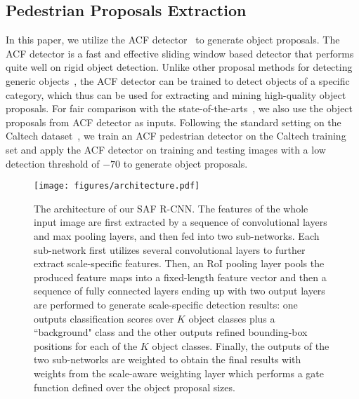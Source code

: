 \documentclass[journal]{IEEEtran}
\begin{document}
\subsection{Pedestrian Proposals Extraction}
In this paper, we utilize the ACF detector~\cite{dollar2014fast} to generate object proposals. The ACF detector is a fast and effective sliding window based detector that performs quite well on rigid object detection. Unlike other proposal methods for detecting generic objects~\cite{uijlings2013selective,arbelaez2014multiscale,zitnick2014edge}, the ACF detector can be trained to detect objects of a specific category, which thus can be used for extracting and mining high-quality object proposals. For fair comparison with the state-of-the-arts~\cite{hosang2015taking,ta_cnn}, we also use the object proposals from ACF detector as inputs. Following the standard setting on the Caltech dataset~\cite{dollar2012pedestrian}, we train an ACF pedestrian detector on the Caltech training set and apply the ACF detector on training and testing images with a low detection threshold of $-70$ to generate object proposals.

\begin{figure*}
	\begin{center}
		\texttt{[image: figures/architecture.pdf]}
		\caption{{The architecture of our SAF R-CNN. The features of the whole input image are first extracted by a sequence of convolutional layers and max pooling layers, and then fed into two sub-networks. Each sub-network first utilizes several convolutional layers to further extract scale-specific features. Then, an RoI pooling layer pools the produced feature maps into a fixed-length feature vector and then a sequence of fully connected layers ending up with two output layers are performed to generate scale-specific detection results: one outputs classification scores over $K$ object classes plus a ``background" class and the other outputs refined bounding-box positions for each of the $K$ object classes. Finally, the outputs of the two sub-networks are weighted to obtain the final results with weights from the scale-aware weighting layer which performs a gate function defined over the object proposal sizes.}}	
		\label{fig:architecture}
	\end{center}
	\vspace{-4mm}
\end{figure*}
\end{document}

